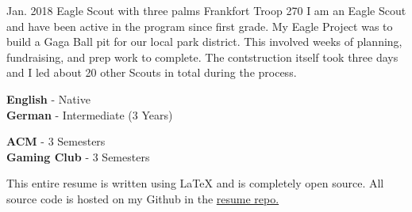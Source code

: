 \documentclass[9pt]{developercv} %
\begin{document}

\begin{entrylist}
	\entry
		{Jan. 2018}
		{Eagle Scout with three palms}
		{Frankfort Troop 270}
		{I am an Eagle Scout and have been active in the program since first grade. My Eagle Project was to build a Gaga Ball pit for our local park district. This involved weeks of planning, fundraising, and prep work to complete. The contstruction itself took three days and I led about 20 other Scouts in total during the process.}
\end{entrylist}

\begin{minipage}[t]{0.3\textwidth}
	\vspace{-\baselineskip} %

	
	\textbf{English} - Native\\
	\textbf{German} - Intermediate (3 Years)\\
\end{minipage}
\hfill
\begin{minipage}[t]{0.25\textwidth}
	\vspace{-\baselineskip} %
	
	
	\textbf{ACM} - 3 Semesters\\
	\textbf{Gaming Club} - 3 Semesters\\
\end{minipage}
\hfill
\begin{minipage}[t]{0.4\textwidth}
	\vspace{-\baselineskip} %
	
	
	This entire resume is written using LaTeX and is completely open source. All source code is hosted on my Github in the \href{https://www.github.com/Dizeeee/resume}{resume repo.}
\end{minipage}

\end{document}
